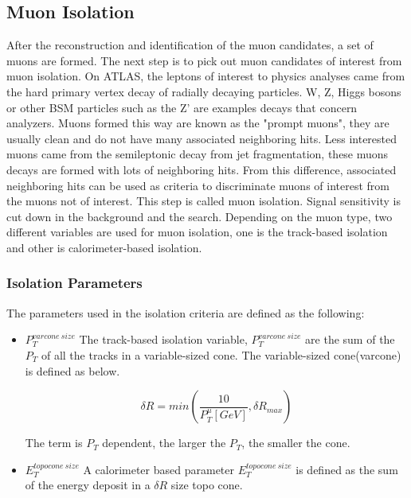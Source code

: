 \subsection{Muon Isolation}
After the reconstruction and identification of the muon candidates, a set of muons are formed. The next step is to pick out muon candidates of interest from muon isolation. On ATLAS, the leptons of interest to physics analyses came from the hard primary vertex decay of radially decaying particles. W, Z, Higgs bosons or other BSM particles such as the Z' are examples decays that concern analyzers. Muons formed this way are known as the "prompt muons", they are usually clean and do not have many
associated neighboring hits. Less interested muons came from the semileptonic decay from jet fragmentation, these muons decays are formed with lots of neighboring hits. From this difference, associated neighboring hits can be used as criteria to discriminate muons of interest from the muons not of interest. This step is called muon isolation. Signal sensitivity is cut down in the background and the search. Depending on the muon type, two different variables are used for muon isolation, one is the track-based isolation and other is calorimeter-based isolation.

\subsubsection*{Isolation Parameters}
The parameters used in the isolation criteria are defined as the following:
\begin{itemize}
    \item  $P_{T}^{varcone\:size}$ \newline
        The track-based isolation variable, $P_{T}^{varcone\:size}$ are the sum of the $P_{T}$ of all the tracks in a variable-sized cone. The variable-sized cone(varcone) is defined as below.

    
\begin{equation}
 \delta R = min(\frac{10}{P^{\mu}_{T}[GeV]}, \delta R_{max}) 
 \end{equation}

The term is $P_{T}$ dependent, the larger the $P_{T}$, the smaller the cone. 
    \item $E^{topocone\:size}_{T}$ \newline
        A calorimeter based parameter $E^{topocone\:size}_T$ is defined as the sum of the energy deposit in a $\delta R$ size topo cone. 

\end{itemize}

